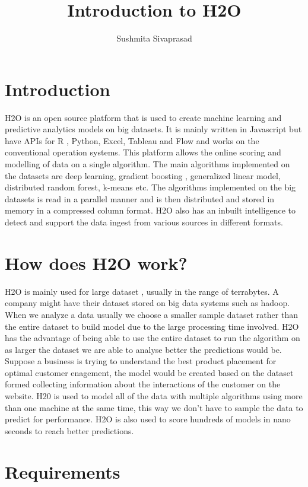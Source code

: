 \documentclass[9pt,twocolumn,twoside]{../../styles/osajnl}
\title{Introduction to H2O}
\author[1]{Sushmita Sivaprasad}
\affil[1]{School of Informatics and Computing, Bloomington, IN 47408, U.S.A.}
\affil[*]{ sushsiva@umail.iu.edu}
\begin{document}
\maketitle

\section{Introduction}

\cite{www-h2o-webpage}H2O is an open source platform that is used
to create machine learning and predictive analytics models on big
datasets. It is mainly written in Javascript but have APIs for R ,
Python, Excel, Tableau and Flow and works on the conventional
operation systems. This platform allows the online scoring and
modelling of data on a single algorithm. The main algorithms
implemented on the datasets are deep learning, gradient boosting ,
generalized linear model, distributed random forest, k-means
etc. The algorithms implemented on the big
datasets is read in a parallel manner and is then distributed and
stored in memory in a compressed column format. H2O also has an
inbuilt intelligence to detect and support the data ingest from
various sources in different formats.

\section{How does H2O work?}

\cite{www-h2oyoutubevideo}H2O is mainly used for large dataset ,
usually in the range of terrabytes. A company might have their dataset
stored on big data systems such as hadoop. When we analyze a data
usually we choose a smaller sample dataset rather than the entire
dataset to build model due to the large processing time involved. H2O
has the advantage of being able to use the entire dataset to run the
algorithm on as larger the dataset we are able to analyse better the
predictions would be. Suppose a business is trying to understand the
best product placement for optimal customer enagement, the model would
be created based on the dataset formed collecting information about
the interactions of the customer on the website. H20 is used to model
all of the data with multiple algorithms using more than one machine
at the same time, this way we don’t have to sample the data to predict
for performance. H2O is also used to score hundreds of models in nano
seconds to reach better predictions.

\section{Requirements}
\end{document}
